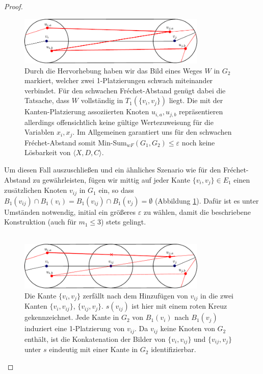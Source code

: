 \documentclass[a4paper, 12pt, twoside]{article}
\theoremstyle{Format1} %
\begin{document}
\begin{proof}
\begin{figure}[htpb]
    \centering
    \includegraphics[width=0.8\textwidth]{chapter_4_example_0.pdf}
    \caption{Durch die Hervorhebung haben wir das Bild eines Weges $W$ in $G_2$ markiert, welcher zwei 1-Platzierungen schwach miteinander verbindet.
	Für den schwachen Fréchet-Abstand genügt dabei die Tatsache, dass $W$ vollständig in $T_1(\{v_i,v_j\})$ liegt.
	Die mit der Kanten-Platzierung assoziierten Knoten $u_{i,a},u_{j,b}$ repräsentieren allerdings offensichtlich keine gültige Wertezuweisung für die Variablen $x_i,x_j$.
	Im Allgemeinen garantiert uns für den schwachen Fréchet-Abstand somit Min-Sum$_{wF}(G_1,G_2) \leq \varepsilon$ noch keine Lösbarkeit von $\langle X,D,C \rangle$.
	}
\end{figure}

Um diesen Fall auszuschließen und ein ähnliches Szenario wie für den Fréchet-Abstand zu gewährleisten, fügen wir mittig auf jeder Kante $\{v_i, v_j\} \in E_1$
einen zusätzlichen Knoten $v_{ij}$ in $G_1$ ein, so dass $B_1(v_{ij}) \cap B_1(v_i) = B_1(v_{ij}) \cap B_1(v_j) = \emptyset$ (Abbildung \ref{fig:chapter_4_example_1}).
Dafür ist es unter Umständen notwendig, initial ein größeres $\varepsilon$ zu wählen, damit die beschriebene Konstruktion (auch für $m_1 \leq 3$) stets gelingt.
\\
\\
\begin{figure}[htpb]
    \centering
    \includegraphics[width=0.8\textwidth]{chapter_4_example_1.pdf}
    \caption{
	Die Kante $\{v_i, v_j\}$ zerfällt nach dem Hinzufügen von $v_{ij}$ in die zwei Kanten $\{v_i, v_{ij}\}$, $\{v_{ij},v_j\}$.
	$s(v_{ij})$ ist hier mit einem roten Kreuz gekennzeichnet.
	Jede Kante in $G_2$ von $B_1(v_i)$ nach $B_1(v_j)$ induziert eine 1-Platzierung
	von $v_{ij}$. Da $v_{ij}$ keine Knoten von $G_2$ enthält, ist die Konkatenation der Bilder von $\{v_i,v_{ij}\}$ und $\{v_{ij},v_j\}$
	unter $s$ eindeutig mit einer Kante in $G_2$ identifizierbar.
	}
    \label{fig:chapter_4_example_1}
\end{figure}


\end{proof}
\end{document}
